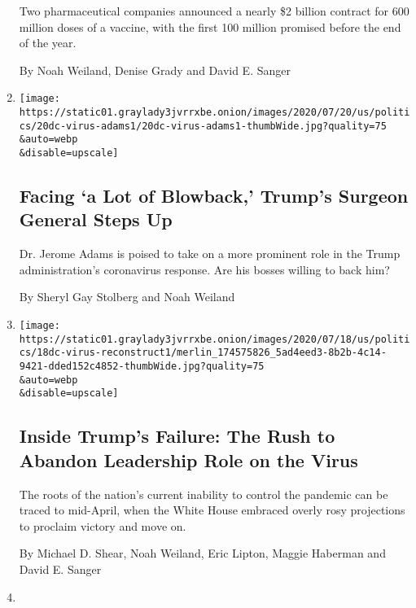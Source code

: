 \begin{enumerate}
  Two pharmaceutical companies announced a nearly \$2 billion contract
  for 600 million doses of a vaccine, with the first 100 million
  promised before the end of the year.

  By Noah Weiland, Denise Grady and David E. Sanger
\item
  \href{/2020/07/21/us/politics/jerome-adams-surgeon-general-trump-coronavirus.html}{}

  \texttt{[image: https://static01.graylady3jvrrxbe.onion/images/2020/07/20/us/politics/20dc-virus-adams1/20dc-virus-adams1-thumbWide.jpg?quality=75\\\&auto=webp\\\&disable=upscale]}

  \hypertarget{facing-a-lot-of-blowback-trumps-surgeon-general-steps-up}{%
  \subsection{Facing `a Lot of Blowback,' Trump's Surgeon General Steps
  Up}\label{facing-a-lot-of-blowback-trumps-surgeon-general-steps-up}}

  Dr. Jerome Adams is poised to take on a more prominent role in the
  Trump administration's coronavirus response. Are his bosses willing to
  back him?

  By Sheryl Gay Stolberg and Noah Weiland
\item
  \href{/2020/07/18/us/politics/trump-coronavirus-response-failure-leadership.html}{}

  \texttt{[image: https://static01.graylady3jvrrxbe.onion/images/2020/07/18/us/politics/18dc-virus-reconstruct1/merlin\_174575826\_5ad4eed3-8b2b-4c14-9421-dded152c4852-thumbWide.jpg?quality=75\\\&auto=webp\\\&disable=upscale]}

  \hypertarget{inside-trumps-failure-the-rush-to-abandon-leadership-role-on-the-virus}{%
  \subsection{Inside Trump's Failure: The Rush to Abandon Leadership
  Role on the
  Virus}\label{inside-trumps-failure-the-rush-to-abandon-leadership-role-on-the-virus}}

  The roots of the nation's current inability to control the pandemic
  can be traced to mid-April, when the White House embraced overly rosy
  projections to proclaim victory and move on.

  By Michael D. Shear, Noah Weiland, Eric Lipton, Maggie Haberman and
  David E. Sanger
\item
  \href{/2020/07/17/us/politics/medicare-agency-inspector-general.html}{}


\end{enumerate}
